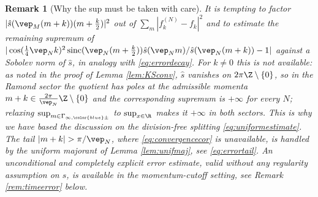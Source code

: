 \documentclass[a4paper, 11pt]{article}
\DeclareMathOperator{\1}{\mathds{1}}
\DeclareMathOperator{\sinc}{sinc}
\newtheorem{rem}[thm]{Remark}
\begin{document}
\begin{rem}[Why the sup must be taken with care]
\label{rem:noquotient}
It is tempting to factor $|\hat{s}(\vep_{M}(m+k))(m+\tfrac{k}{2})|^{2}$ out of $\sum_{m}|f^{(N)}_{k}-f_{k}|^{2}$ and to estimate the remaining supremum of $|\cos(\tfrac{1}{4}\vep_{N}k)^{2}\sinc(\vep_{N}(m+\tfrac{k}{2}))\hat{s}(\vep_{N}m)/\hat{s}(\vep_{N}(m+k))-1|$ against a Sobolev norm of $\hat{s}$, in analogy with \eqref{eq:errordecay}. For $k\neq0$ this is not available: as noted in the proof of Lemma \ref{lem:KSconv}, $\hat{s}$ vanishes on $2\pi\Z\setminus\{0\}$, so in the Ramond sector the quotient has poles at the admissible momenta $m+k\in\tfrac{2\pi}{\vep_{N}}\Z\setminus\{0\}$ and the corresponding supremum is $+\infty$ for every $N$; relaxing $\sup_{m\in\Gamma_{\infty,{\color{blue}\pm}}}$ to $\sup_{x\in\R}$ makes it $+\infty$ in both sectors. This is why we have based the discussion on the division-free splitting \eqref{eq:uniformestimate}. The tail $|m+k|>\pi/\vep_{N}$, where \eqref{eq:convergencecor} is unavailable, is handled by the uniform majorant of Lemma \ref{lem:unifmaj}, see \eqref{eq:errortail}. An unconditional and completely explicit error estimate, valid without any regularity assumption on $s$, is available in the momentum-cutoff setting, see Remark \ref{rem:timeerror} below.
\end{rem}
\end{document}
